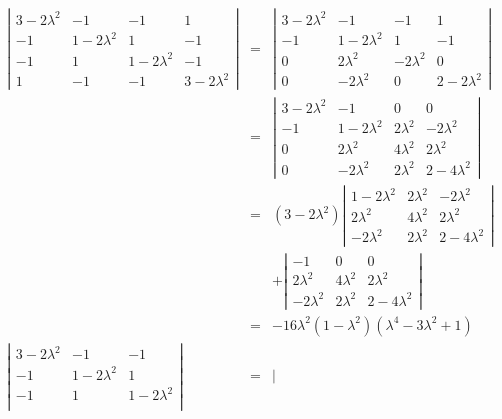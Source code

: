 \documentclass[letterpaper,11pt]{article}
\begin{document}
\begin{eqnarray*}
 \left| \begin{array}{cccc}
 3 - 2 \lambda^2 & -1 & -1 & 1 \\
 -1 & 1 - 2 \lambda^2 & 1 & -1 \\
 -1 & 1 & 1 - 2 \lambda^2 & -1 \\
 1 & -1 & -1 & 3 - 2 \lambda^2
 \end{array} \right| & = & \left| \begin{array}{cccc}
 3 - 2 \lambda^2 & -1 & -1 & 1 \\
 -1 & 1 - 2 \lambda^2 & 1 & -1 \\
 0 & 2 \lambda^2 & - 2 \lambda^2 & 0 \\
 0 & - 2 \lambda^2 & 0 & 2 - 2 \lambda^2
 \end{array} \right| \\
 & = & \left| \begin{array}{cccc}
 3 - 2 \lambda^2 & -1 & 0 & 0 \\
 -1 & 1 - 2 \lambda^2 & 2 \lambda^2 & - 2 \lambda^2 \\
 0 & 2 \lambda^2 & 4 \lambda^2 & 2 \lambda^2 \\
 0 & - 2 \lambda^2 & 2 \lambda^2 & 2 - 4 \lambda^2
 \end{array} \right| \\
 & = & (3 - 2 \lambda^2) \left| \begin{array}{ccc}
 1 - 2 \lambda^2 & 2 \lambda^2 & - 2 \lambda^2 \\
 2 \lambda^2 & 4 \lambda^2 & 2 \lambda^2 \\
 - 2 \lambda^2 & 2 \lambda^2 & 2 - 4 \lambda^2
 \end{array} \right| \\
 & & + \left| \begin{array}{ccc}
 -1 & 0 & 0 \\
 2 \lambda^2 & 4 \lambda^2 & 2 \lambda^2 \\
 - 2 \lambda^2 & 2 \lambda^2 & 2 - 4 \lambda^2
 \end{array} \right| \\
 & = & - 16 \lambda^2 (1 - \lambda^2) (\lambda^4 - 3 \lambda^2 + 1) \\
\left| \begin{array}{cccc}
 3 - 2 \lambda^2 & -1 & -1 \\
 -1 & 1 - 2 \lambda^2 & 1 \\
 -1 & 1 & 1 - 2 \lambda^2 \\
 \end{array} \right| & = & \left| \begin{array}{cccc}

\end{array}
\end{eqnarray*}
\end{document}
